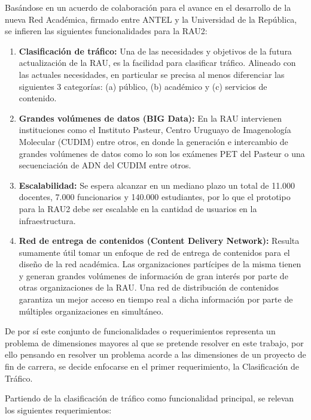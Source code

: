 Basándose en un acuerdo de colaboración para el avance en el desarrollo de la nueva Red Académica, firmado entre ANTEL y la Universidad de la República, se infieren las siguientes funcionalidades para la RAU2:

\begin{enumerate}
\item \textbf{Clasificación de tráfico:} Una de las necesidades y objetivos de la futura actualizaci\'on de la RAU, es la facilidad para clasificar tráfico. Alineado con las actuales necesidades, en particular se precisa al menos diferenciar las siguientes 3 categorías: (a) público, (b) académico y (c) servicios de contenido.

\item \textbf{Grandes volúmenes de datos (BIG Data):} En la RAU intervienen instituciones como el Instituto Pasteur, Centro Uruguayo de Imagenología Molecular (CUDIM) entre otros, en donde la generación e intercambio de grandes volúmenes de datos como lo son los exámenes PET del Pasteur o una secuenciación de ADN del CUDIM entre otros.

\item \textbf{Escalabilidad:} Se espera alcanzar en un mediano plazo un total de 11.000 docentes, 7.000 funcionarios y 140.000 estudiantes, por lo que el prototipo para la RAU2 debe ser escalable en la cantidad de usuarios en la infraestructura.

\item \textbf{Red de entrega de contenidos (Content Delivery Network):} Resulta sumamente útil tomar un enfoque de red de entrega de contenidos para el diseño de la red académica. Las organizaciones partícipes de la misma tienen y generan grandes volúmenes de información de gran interés por parte de otras organizaciones de la RAU. Una red de distribución de contenidos garantiza un mejor acceso en tiempo real a dicha información por parte de múltiples organizaciones en simultáneo. 
 
\end{enumerate}

De por s\'i este conjunto de funcionalidades o requerimientos representa un problema de dimensiones mayores al que se pretende resolver en este trabajo, por ello pensando en resolver un problema acorde a las dimensiones de un proyecto de fin de carrera, se decide enfocarse en el primer requerimiento, la Clasificación de Tr\'afico.

Partiendo de la clasificación de tr\'afico como funcionalidad principal, se relevan los siguientes requerimientos:

